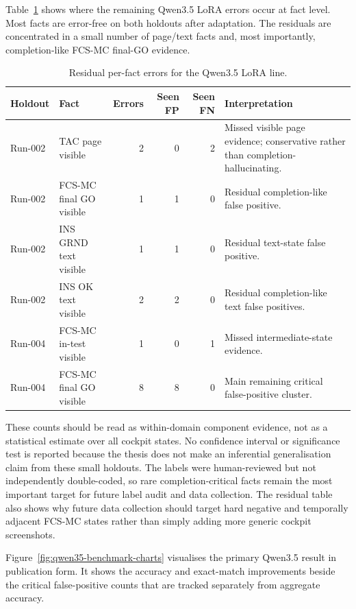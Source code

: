 Table~\ref{tab:qwen35-residual-facts} shows where the remaining Qwen3.5 LoRA
errors occur at fact level. Most facts are error-free on both holdouts after
adaptation. The residuals are concentrated in a small number of page/text facts
and, most importantly, completion-like FCS-MC final-GO evidence.

\begin{table}[htbp]
\centering
\caption{Residual per-fact errors for the Qwen3.5 LoRA line.}
\label{tab:qwen35-residual-facts}
\small
\begin{tabularx}{\textwidth}{@{}llrrrX@{}}
\toprule
\textbf{Holdout} & \textbf{Fact} & \textbf{Errors} & \textbf{Seen FP} & \textbf{Seen FN} & \textbf{Interpretation} \\
\midrule
Run-002 & TAC page visible & 2 & 0 & 2 & Missed visible page evidence; conservative rather than completion-hallucinating. \\
Run-002 & FCS-MC final GO visible & 1 & 1 & 0 & Residual completion-like false positive. \\
Run-002 & INS GRND text visible & 1 & 1 & 0 & Residual text-state false positive. \\
Run-002 & INS OK text visible & 2 & 2 & 0 & Residual completion-like text false positives. \\
Run-004 & FCS-MC in-test visible & 1 & 0 & 1 & Missed intermediate-state evidence. \\
Run-004 & FCS-MC final GO visible & 8 & 8 & 0 & Main remaining critical false-positive cluster. \\
\bottomrule
\end{tabularx}
\end{table}

These counts should be read as within-domain component evidence, not as a
statistical estimate over all cockpit states. No confidence interval or
significance test is reported because the thesis does not make an inferential
generalisation claim from these small holdouts. The labels were human-reviewed
but not independently double-coded, so rare completion-critical facts remain
the most important target for future label audit and data collection. The
residual table also shows why future data collection should target hard
negative and temporally adjacent FCS-MC states rather than simply adding more
generic cockpit screenshots.

Figure~\ref{fig:qwen35-benchmark-charts} visualises the primary Qwen3.5 result
in publication form. It shows the accuracy and exact-match improvements beside
the critical false-positive counts that are tracked separately from aggregate
accuracy.

